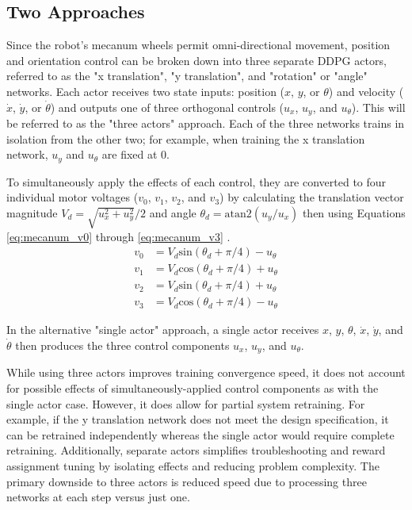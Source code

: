 \subsection{Two Approaches}
Since the robot's mecanum wheels permit omni-directional movement, position and orientation control can be broken down into three separate DDPG actors, referred to as the "x translation", "y translation", and "rotation" or "angle" networks. Each actor receives two state inputs: position ($x$, $y$, or $\theta$) and velocity ($\dot{x}$, $\dot{y}$, or $\dot{\theta}$) and outputs one of three orthogonal controls ($u_x$, $u_y$, and $u_\theta$). This will be referred to as the "three actors" approach. Each of the three networks trains in isolation from the other two; for example, when training the x translation network, $u_y$ and $u_\theta$ are fixed at 0.

To simultaneously apply the effects of each control, they are converted to four individual motor voltages ($v_0$, $v_1$, $v_2$, and $v_3$) by calculating the translation vector magnitude $V_d = \sqrt{u_x^2 + u_y^2}/2$ and angle $\theta_d = \text{atan2}(u_y / u_x)$ then using Equations \ref{eq:mecanum_v0} through \ref{eq:mecanum_v3} \cite{li_2018}\cite{rahman_2014}. 
\begin{align}
v_0 &= V_d \text{sin}(\theta_d + \pi/4) - u_\theta  \label{eq:mecanum_v0}\\
v_1 &= V_d \text{cos}(\theta_d + \pi/4) + u_\theta  \label{eq:mecanum_v1}\\
v_2 &= V_d \text{sin}(\theta_d + \pi/4) + u_\theta  \label{eq:mecanum_v2}\\
v_3 &= V_d \text{cos}(\theta_d + \pi/4) - u_\theta  \label{eq:mecanum_v3}
\end{align}

In the alternative "single actor" approach, a single actor receives $x$, $y$, $\theta$, $\dot{x}$, $\dot{y}$, and $\dot{\theta}$ then produces the three control components $u_x$, $u_y$, and $u_\theta$. 

While using three actors improves training convergence speed, it does not account for possible effects of simultaneously-applied control components as with the single actor case. However, it does allow for partial system retraining. For example, if the y translation network does not meet the design specification, it can be retrained independently whereas the single actor would require complete retraining. Additionally, separate actors simplifies troubleshooting and reward assignment tuning by isolating effects and reducing problem complexity. The primary downside to three actors is reduced speed due to processing three networks at each step versus just one. 

